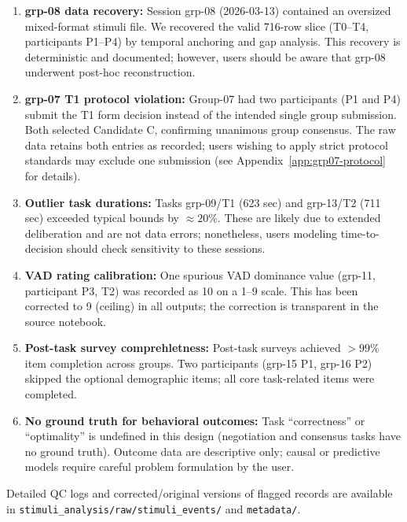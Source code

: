 \documentclass[11pt,a4paper]{article}
\begin{document}
\begin{enumerate}
  \item \textbf{grp-08 data recovery:} Session grp-08 (2026-03-13) contained
    an oversized mixed-format stimuli file. We recovered the valid 716-row slice
    (T0–T4, participants P1–P4) by temporal anchoring and gap analysis.
    This recovery is deterministic and documented; however, users should be
    aware that grp-08 underwent post-hoc reconstruction.

  \item \textbf{grp-07 T1 protocol violation:} Group-07 had two participants 
    (P1 and P4) submit the T1 form decision instead of the intended single group submission.
    Both selected Candidate C, confirming unanimous group consensus. The raw data retains both 
    entries as recorded; users wishing to apply strict protocol standards may exclude one 
    submission (see Appendix~\ref{app:grp07-protocol} for details).

  \item \textbf{Outlier task durations:} Tasks grp-09/T1 (623 sec) and
    grp-13/T2 (711 sec) exceeded typical bounds by $\approx 20\%$.
    These are likely due to extended deliberation and are not data errors;
    nonetheless, users modeling time-to-decision should check sensitivity
    to these sessions.

  \item \textbf{VAD rating calibration:} One spurious VAD dominance value
    (grp-11, participant P3, T2) was recorded as 10 on a 1–9 scale.
    This has been corrected to 9 (ceiling) in all outputs; the correction
    is transparent in the source notebook.

  \item \textbf{Post-task survey comprehletness:} Post-task surveys achieved
    $> 99\%$ item completion across groups. Two participants (grp-15 P1, grp-16 P2)
    skipped the optional demographic items; all core task-related items
    were completed.

  \item \textbf{No ground truth for behavioral outcomes:}
    Task ``correctness'' or ``optimality'' is undefined in this design
    (negotiation and consensus tasks have no ground truth).
    Outcome data are descriptive only; causal or predictive models
    require careful problem formulation by the user.
\end{enumerate}

Detailed QC logs and corrected/original versions of flagged records
are available in \texttt{stimuli\_analysis/raw/stimuli\_events/} and
\texttt{metadata/}.
\end{document}

